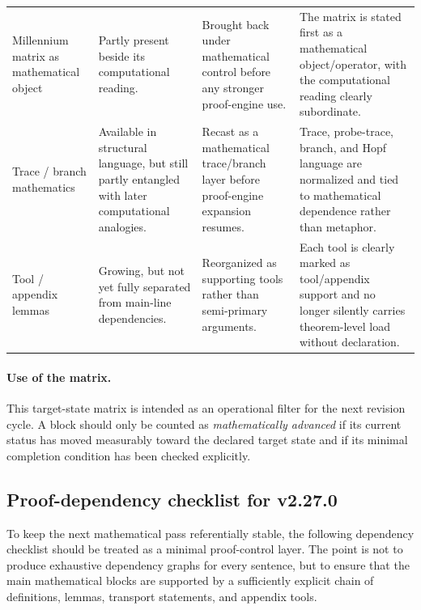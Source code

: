 \begin{longtable}{p{}p{}p{}p{}}
Millennium matrix as mathematical object & Partly present beside its computational reading. & Brought back under mathematical control before any stronger proof-engine use. & The matrix is stated first as a mathematical object/operator, with the computational reading clearly subordinate. \\

Trace / branch mathematics & Available in structural language, but still partly entangled with later computational analogies. & Recast as a mathematical trace/branch layer before proof-engine expansion resumes. & Trace, probe-trace, branch, and Hopf language are normalized and tied to mathematical dependence rather than metaphor. \\

Tool / appendix lemmas & Growing, but not yet fully separated from main-line dependencies. & Reorganized as supporting tools rather than semi-primary arguments. & Each tool is clearly marked as tool/appendix support and no longer silently carries theorem-level load without declaration. \\
\bottomrule
\end{longtable}

\paragraph{Use of the matrix.}
This target-state matrix is intended as an operational filter for the next revision cycle. A block should only be counted as \emph{mathematically advanced} if its current status has moved measurably toward the declared target state and if its minimal completion condition has been checked explicitly.

\subsection*{Proof-dependency checklist for v2.27.0}
To keep the next mathematical pass referentially stable, the following dependency checklist should be treated as a minimal proof-control layer. The point is not to produce exhaustive dependency graphs for every sentence, but to ensure that the main mathematical blocks are supported by a sufficiently explicit chain of definitions, lemmas, transport statements, and appendix tools.

